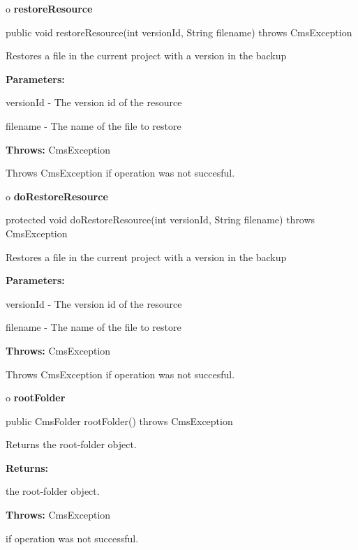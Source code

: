 o {\bf restoreResource} 

\begin{PRE}
 public void restoreResource(int versionId,
                             String filename) throws CmsException
\end{PRE}

\begin{description}
\htmlDD Restores a file in the current project with a version in the backup 

\begin{description}
\item {\bf Parameters:}  

versionId - The version id of the resource  

filename - The name of the file to restore  
\item {\bf Throws:} CmsException  

Throws CmsException if operation was not succesful.  
\end{description}

\end{description}

o {\bf doRestoreResource} 

\begin{PRE}
 protected void doRestoreResource(int versionId,
                                  String filename) throws CmsException
\end{PRE}

\begin{description}
\htmlDD Restores a file in the current project with a version in the backup 

\begin{description}
\item {\bf Parameters:}  

versionId - The version id of the resource  

filename - The name of the file to restore  
\item {\bf Throws:} CmsException  

Throws CmsException if operation was not succesful.  
\end{description}

\end{description}

o {\bf rootFolder} 

\begin{PRE}
 public CmsFolder rootFolder() throws CmsException
\end{PRE}

\begin{description}
\htmlDD Returns the root-folder object. 

\begin{description}
\item {\bf Returns:}  

the root-folder object.  
\item {\bf Throws:} CmsException  

if operation was not successful.  
\end{description}

\end{description}

